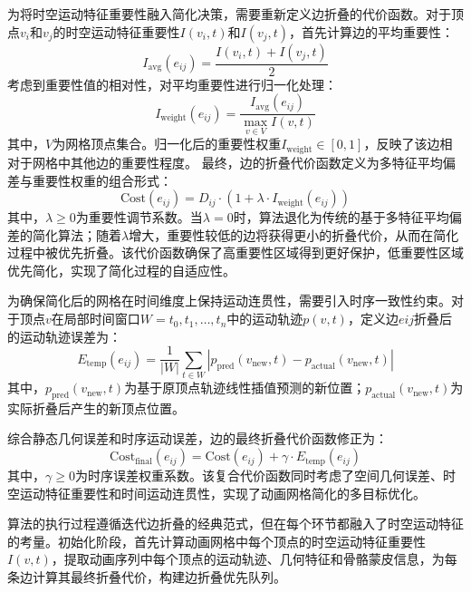 为将时空运动特征重要性融入简化决策，需要重新定义边折叠的代价函数。对于顶点$v_i$和$v_j$的时空运动特征重要性$I(v_i,t)$和$I(v_j,t)$，首先计算边的平均重要性：
\begin{equation}
I_{\text{avg}}(e_{ij}) = \frac{I(v_i,t) + I(v_j,t)}{2}
\label{eq:avg_importance}
\end{equation}
考虑到重要性值的相对性，对平均重要性进行归一化处理：
\begin{equation}
I_{\text{weight}}(e_{ij}) = \frac{I_{\text{avg}}(e_{ij})}{\max_{v \in V} I(v,t)}
\label{eq:normalized_importance}
\end{equation}
其中，$V$为网格顶点集合。归一化后的重要性权重$I_{\text{weight}} \in [0,1]$，反映了该边相对于网格中其他边的重要性程度。
最终，边的折叠代价函数定义为多特征平均偏差与重要性权重的组合形式：
\begin{equation} 
\text{Cost}(e_{ij}) = D_{ij} \cdot \left( 1 + \lambda \cdot I_{\text{weight}}(e_{ij}) \right) 
\label{eq:collapse_cost} 
\end{equation}
其中，$\lambda \geq 0$为重要性调节系数。当$\lambda=0$时，算法退化为传统的基于多特征平均偏差的简化算法；随着$\lambda$增大，重要性较低的边将获得更小的折叠代价，从而在简化过程中被优先折叠。该代价函数确保了高重要性区域得到更好保护，低重要性区域优先简化，实现了简化过程的自适应性。

为确保简化后的网格在时间维度上保持运动连贯性，需要引入时序一致性约束。对于顶点$v$在局部时间窗口$W={t_0,t_1,\ldots,t_n}$中的运动轨迹${p(v,t)}$，定义边$e{ij}$折叠后的运动轨迹误差为：
\begin{equation}
E_{\text{temp}}(e_{ij}) = \frac{1}{|W|} \sum_{t \in W} \left| p_{\text{pred}}(v_{\text{new}},t) - p_{\text{actual}}(v_{\text{new}},t) \right|
\label{eq:temporal_error}
\end{equation}
其中，$p_{\text{pred}}(v_{\text{new}},t)$为基于原顶点轨迹线性插值预测的新位置；$p_{\text{actual}}(v_{\text{new}},t)$为实际折叠后产生的新顶点位置。

综合静态几何误差和时序运动误差，边的最终折叠代价函数修正为：
\begin{equation}
\text{Cost}_{\text{final}}(e_{ij}) = \text{Cost}(e_{ij}) + \gamma \cdot E_{\text{temp}}(e_{ij})
\label{eq:final_cost}
\end{equation}
其中，$\gamma \geq 0$为时序误差权重系数。该复合代价函数同时考虑了空间几何误差、时空运动特征重要性和时间运动连贯性，实现了动画网格简化的多目标优化。

算法的执行过程遵循迭代边折叠的经典范式，但在每个环节都融入了时空运动特征的考量。初始化阶段，首先计算动画网格中每个顶点的时空运动特征重要性$I(v,t)$，提取动画序列中每个顶点的运动轨迹、几何特征和骨骼蒙皮信息，为每条边计算其最终折叠代价，构建边折叠优先队列。

